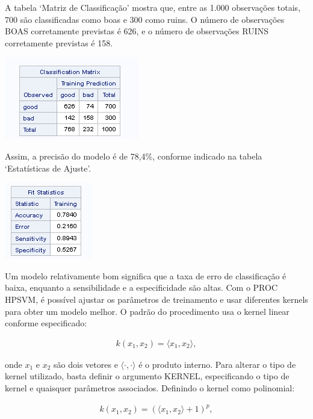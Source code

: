 \documentclass[
  a4paperpaper,
]{article}
\begin{document}
A tabela `Matriz de Classificação' mostra que, entre as 1.000
observações totais, 700 são classificadas como boas e 300 como ruins. O
número de observações BOAS corretamente previstas é 626, e o número de
observações RUINS corretamente previstas é 158.

\begin{center}
\includegraphics{tabela_classification1.png}
\end{center}

Assim, a precisão do modelo é de 78,4\%, conforme indicado na tabela
`Estatísticas de Ajuste'.

\begin{center}
\includegraphics{tabela_fit1.png}
\end{center}

Um modelo relativamente bom significa que a taxa de erro de
classificação é baixa, enquanto a sensibilidade e a especificidade são
altas. Com o PROC HPSVM, é possível ajustar os parâmetros de treinamento
e usar diferentes kernels para obter um modelo melhor. O padrão do
procedimento usa o kernel linear conforme especificado:

\begin{align} 
  k(x_1, x_2) = \langle x_1, x_2 \rangle, 
\end{align}

onde \(x_1\) e \(x_2\) são dois vetores e
\(\langle \cdot, \cdot \rangle\) é o produto interno. Para alterar o
tipo de kernel utilizado, basta definir o argumento KERNEL,
especificando o tipo de kernel e quaisquer parâmetros associados.
Definindo o kernel como polinomial:

\begin{align}
  k(x_1, x_2) = \left(\langle x_1, x_2 \rangle + 1 \right)^p,
\end{align}
\end{document}
